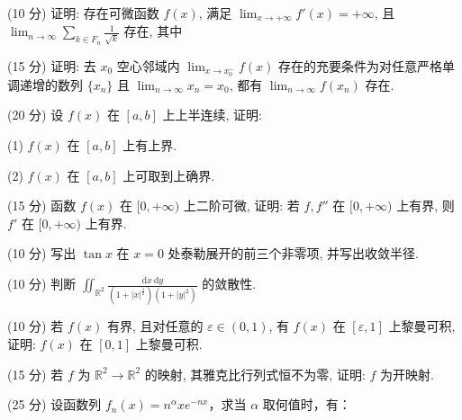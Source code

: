 \par{}
(10 分) 证明: 存在可微函数 $f(x)$, 满足 $\lim_{x \to +\infty} f'(x) = +\infty$, 且 $\lim_{n \to \infty} \sum_{k \in F_n} \frac{1}{\sqrt{k}}$ 存在, 其中\par
\nopagebreak[4]
(15 分) 证明: 去 $x_0$ 空心邻域内 $\lim_{x \to x_0^-} f(x)$ 存在的充要条件为对任意严格单调递增的数列 $\{x_n\}$ 且 $\lim_{n \to \infty} x_n = x_0$, 都有 $\lim_{n \to \infty} f(x_n)$ 存在.\par
(20 分) 设 $f(x)$ 在 $[a, b]$ 上上半连续, 证明:\par
(1) $f(x)$ 在 $[a, b]$ 上有上界.\par
(2) $f(x)$ 在 $[a, b]$ 上可取到上确界.\par
(15 分) 函数 $f(x)$ 在 $[0, +\infty)$ 上二阶可微, 证明: 若 $f, f''$ 在 $[0, +\infty)$ 上有界, 则 $f'$ 在 $[0, +\infty)$ 上有界.\par
(10 分) 写出 $\tan x$ 在 $x = 0$ 处泰勒展开的前三个非零项, 并写出收敛半径.\par
(10 分) 判断 $\iint_{\mathbb{R}^2} \frac{\mathrm{d}x \mathrm{~d}y}{(1 + |x|^{\frac{1}{2}})(1 + |y|^2)}$ 的敛散性.\par
(10 分) 若 $f(x)$ 有界, 且对任意的 $\varepsilon \in (0,1)$, 有 $f(x)$ 在 $[\varepsilon,1]$ 上黎曼可积, 证明: $f(x)$ 在 $[0,1]$ 上黎曼可积.\par
(15 分) 若 $f$ 为 $\mathbb{R}^2 \to \mathbb{R}^2$ 的映射, 其雅克比行列式恒不为零, 证明: $f$ 为开映射.\par
(25 分) 设函数列 $f_{n}(x) = n^{\alpha}xe^{-nx}$，求当 $\alpha$ 取何值时，有：\par
